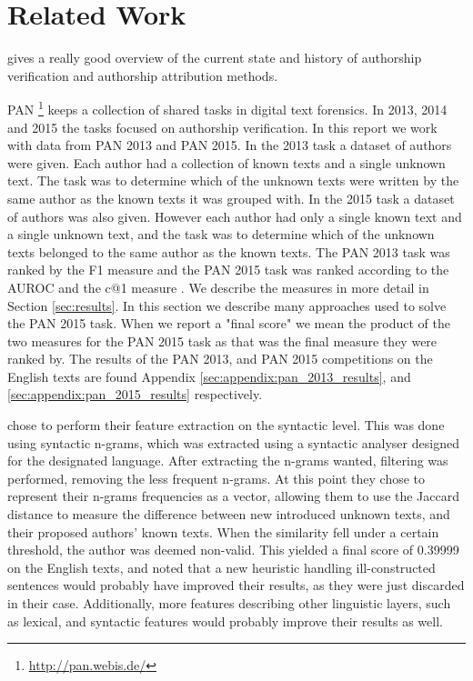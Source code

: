 \section{Related Work} \label{sec:related_work}
\cite{stamatos2009} gives a really good overview of the current state and
history of authorship verification and authorship attribution methods.

PAN \footnote{\url{http://pan.webis.de/}} keeps a collection of shared tasks in
digital text forensics. In 2013, 2014 and 2015 the tasks focused on authorship
verification. In this report we work with data from PAN 2013 and PAN 2015. In
the 2013 task a dataset of authors were given. Each author had a collection of
known texts and a single unknown text. The task was to determine which of the
unknown texts were written by the same author as the known texts it was grouped
with. In the 2015 task a dataset of authors was also given. However each author
had only a single known text and a single unknown text, and the task was to
determine which of the unknown texts belonged to the same author as the known
texts. The PAN 2013 task was ranked by the F1 measure and the PAN 2015 task
was ranked according to the \gls{AUROC} and the c@1 measure \cite{penas2011}.
We describe the measures in more detail in Section \ref{sec:results}. In this
section we describe many approaches used to solve the PAN 2015 task. When we
report a "final score" we mean the product of the two measures for the PAN 2015
task as that was the final measure they were ranked by. The results of the
PAN 2013, and PAN 2015 competitions on the English texts are found Appendix
\ref{sec:appendix:pan_2013_results}, and \ref{sec:appendix:pan_2015_results}
respectively.

\cite{juanpablo2015} chose to perform their feature extraction on the syntactic
level. This was done using syntactic n-grams, which was extracted using a
syntactic analyser designed for the designated language. After extracting the
n-grams wanted, filtering was performed, removing the less frequent n-grams.
At this point they chose to represent their n-grams frequencies as a vector,
allowing them to use the Jaccard distance to measure the difference between new
introduced unknown texts, and their proposed authors' known texts. When the
similarity fell under a certain threshold, the author was deemed non-valid. This
yielded a final score of 0.39999 on the English texts, and \cite{juanpablo2015}
noted that a new heuristic handling ill-constructed sentences would probably
have improved their results, as they were just discarded in their case.
Additionally, more features describing other linguistic layers, such as lexical,
and syntactic features would probably improve their results as well.

